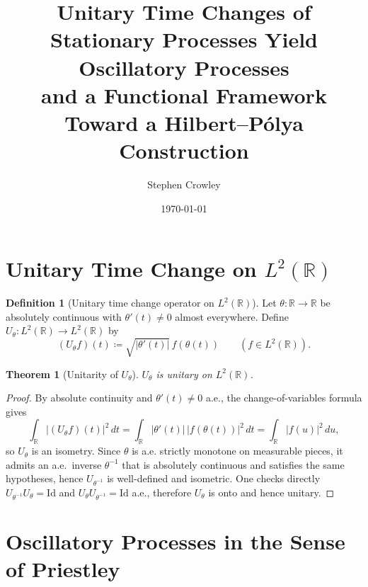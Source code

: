 \documentclass[12pt]{article}
\title{Unitary Time Changes of Stationary Processes Yield Oscillatory Processes\\
and a Functional Framework Toward a Hilbert--P\'olya Construction}
\author{Stephen Crowley}
\date{\today}
\newtheorem{theorem}{Theorem}
\theoremstyle{definition}
\newtheorem{definition}{Definition}
\theoremstyle{remark}
\begin{document}
\maketitle

\section{Unitary Time Change on $L^2(\mathbb{R})$}

\begin{definition}[Unitary time change operator on $L^2(\mathbb{R})$]
Let $\theta:\mathbb{R}\to\mathbb{R}$ be absolutely continuous with $\theta'(t)\neq 0$ almost everywhere.
Define $U_\theta:L^2(\mathbb{R})\to L^2(\mathbb{R})$ by
\begin{equation}
  (U_\theta f)(t)\coloneqq \sqrt{|\theta'(t)|}\, f(\theta(t))\qquad (f\in L^2(\mathbb{R})).
\end{equation}
\end{definition}

\begin{theorem}[Unitarity of $U_\theta$]
$U_\theta$ is unitary on $L^2(\mathbb{R})$.
\end{theorem}

\begin{proof}
By absolute continuity and $\theta'(t)\neq 0$ a.e., the change-of-variables formula gives
\[
\int_{\mathbb{R}} |(U_\theta f)(t)|^2\,dt
= \int_{\mathbb{R}} |\theta'(t)|\,|f(\theta(t))|^2\,dt
= \int_{\mathbb{R}} |f(u)|^2\,du,
\]
so $U_\theta$ is an isometry. Since $\theta$ is a.e. strictly monotone on measurable pieces, it admits an a.e.\ inverse $\theta^{-1}$ that is absolutely continuous and satisfies the same hypotheses, hence $U_{\theta^{-1}}$ is well-defined and isometric. One checks directly $U_{\theta^{-1}}U_\theta=\mathrm{Id}$ and $U_\theta U_{\theta^{-1}}=\mathrm{Id}$ a.e., therefore $U_\theta$ is onto and hence unitary.
\end{proof}

\section{Oscillatory Processes in the Sense of Priestley}
\end{document}
